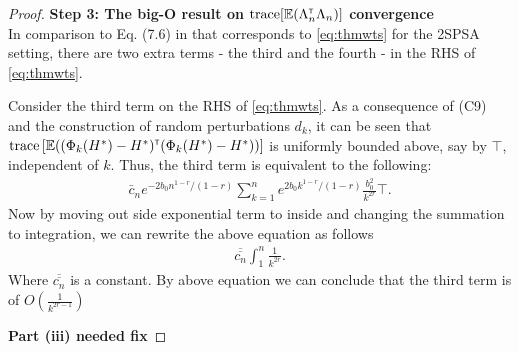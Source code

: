 \begin{proof}
\noindent\textbf{Step 3: The big-O result on $\text{trace}[\mathbb{E} (\Lambda_n ^\mathsf{\scriptscriptstyle T} \Lambda_n)]$ convergence} \\
In comparison to Eq. (7.6) in \cite{spall-jacobian} that corresponds to \eqref{eq:thmwts} for the 2SPSA setting, there are two extra terms - the third and the fourth - in the RHS of \eqref{eq:thmwts}. 

Consider the third term on the RHS of \eqref{eq:thmwts}. As a consequence of (C9) and the construction of random perturbations $d_k$, it can be seen that $\text{trace}\left[\mathbb{E} ((\Phi_k(H^*) - H^*) ^\mathsf{\scriptscriptstyle T}  (\Phi_k(H^*) - H^*))\right]$ is uniformly bounded above, say by $\top$, independent of $k$. Thus, the third term is equivalent to the following:
\begin{align}
 \bar c_n e^{-2 b_0 n^{1-r}/(1-r)} \sum_{k=1}^n e^{2 b_0 k^{1-r}/(1-r)}  \frac{b_0^2}{k^{2 r}} \top.
\label{eq:term3}
\end{align}
Now by moving out side exponential term to inside and changing the summation to integration, we can rewrite the above equation as follows
\begin{align}
  \overline{\overline{c_n}}  \int_1^n  \frac{1}{k^{2 r}} .
\label{eq:term3}
\end{align}
Where $\overline{\overline{c_n}}$ is a constant. By above equation we can conclude that the third term is of $O(\frac{1}{k^{2 r -1}})$
%

\textbf{Part (iii) needed fix} 
\end{proof}
